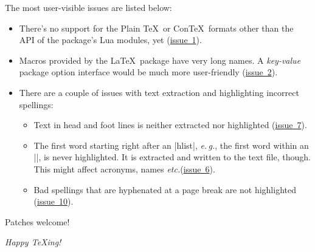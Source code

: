 \documentclass[11pt]{article}
\newcommand*{\acr}[1]{\mbox{\scshape#1}}
\newcommand*{\latinphrase}[1]{\foreignlanguage{latin}{\emph{#1}}}
\newcommand*{\lpeg}{\latinphrase{e.\,g.}\xspace}
\newcommand*{\lpetc}{\latinphrase{etc.}\xspace}
\begin{document}
The most user-visible issues are listed below:

\begin{itemize}

\item There's no support for the Plain \TeX\ or Con\TeX\ formats other
  than the \acr{API} of the package's Lua modules, yet
  (\href{https://github.com/sh2d/spelling/issues/1}{issue~1}).

\item Macros provided by the \LaTeX\ package have very long names.  A
  \emph{key-value} package option interface would be much more
  user-friendly
  (\href{https://github.com/sh2d/spelling/issues/2}{issue~2}).

\item There are a couple of issues with text extraction and highlighting
  incorrect spellings:

  \begin{itemize}

  \item Text in head and foot lines is neither extracted nor highlighted
    (\href{https://github.com/sh2d/spelling/issues/7}{issue~7}).

  \item The first word starting right after an |hlist|, \lpeg, the first
    word within an |\mbox|, is never highlighted.  It is extracted and
    written to the text file, though.  This might affect acronyms, names
    \lpetc (\href{https://github.com/sh2d/spelling/issues/6}{issue~6}).

  \item Bad spellings that are hyphenated at a page break are not
    highlighted
    (\href{https://github.com/sh2d/spelling/issues/10}{issue~10}).

  \end{itemize}


\end{itemize}

Patches welcome!

\bigskip
\emph{Happy \TeX ing!}
\end{document}

